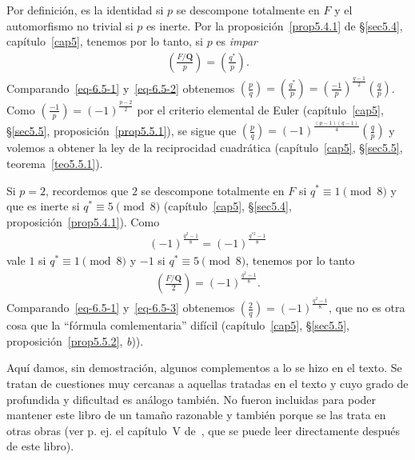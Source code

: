 \documentclass[10pt,oneside,bibtotoc,smallheadings,leqno,a5paper,DIV=12]{scrbook}
\newcommand{\QQ}{\mathbf{Q}}
\numberwithin{equation}{section}
\theoremstyle{defi}
\theoremstyle{enonce}
\theoremstyle{rem}
\numberwithin{theorem}{section}
\numberwithin{proposition}{section}
\numberwithin{definition}{section}
\numberwithin{lemma}{section}
\numberwithin{corollary}{section}
\numberwithin{example}{section}
\numberwithin{footnote}{section}%
\begin{document}
Por definici\'on, es la identidad si $p$ se descompone totalmente en $F$ y el automorfismo no trivial si $p$
es inerte. Por la proposici\'on~\ref{prop5.4.1} de \S\ref{sec5.4}, cap\'itulo~\ref{cap5}, tenemos por lo tanto, si $p$ es {\em impar}
\begin{gather}\label{eq-6.5-2}
\left(\frac{F/\QQ}{p}\right) = \left(\frac{q^{*}}{p}\right).
\end{gather}
Comparando~\eqref{eq-6.5-1} y~\eqref{eq-6.5-2} obtenemos $\left(\frac{p}{q}\right)=\left(\frac{q^{*}}{p}\right)
=\left(\frac{-1}{p}\right)^{\frac{q-1}{2}}\left(\frac{q}{p}\right)$. Como $\left(\frac{-1}{p}\right)=(-1)^{\frac{p-2}{2}}$
por el criterio elemental de Euler (cap\'itulo~\ref{cap5}, \S\ref{sec5.5}, proposici\'on~\ref{prop5.5.1}), se sigue que $\left(\frac{p}{q}\right)
=(-1)^{\frac{(p-1)(q-1)}{4}}\left(\frac{q}{p}\right)$ y volemos a obtener la ley de la reciprocidad cuadr\'atica
(cap\'itulo~\ref{cap5}, \S\ref{sec5.5}, teorema~\ref{teo5.5.1}).

Si $p=2$, recordemos que $2$ se descompone totalmente en $F$ si $q^{*}\equiv 1\pmod 8$ y que es inerte
si $q^{*}\equiv 5\pmod 8$ (cap\'itulo~\ref{cap5}, \S\ref{sec5.4}, proposici\'on~\ref{prop5.4.1}). Como
\begin{gather*}
(-1)^{\frac{q^{2}-1}{8}}=(-1)^{\frac{q^{*2}-1}{8}}
\end{gather*}
vale $1$ si $q^{*}\equiv 1\pmod 8$ y $-1$ si $q^{*}\equiv 5\pmod 8$, tenemos por lo tanto
\begin{gather}\label{eq-6.5-3}
\left(\frac{F/\QQ}{2}\right)=(-1)^{\frac{q^{2}-1}{8}}.
\end{gather}
Comparando~\eqref{eq-6.5-1} y~\eqref{eq-6.5-3} obtenemos $\left(\frac{2}{q}\right) = (-1)^{\frac{q^{2}-1}{8}}$,
que no es otra cosa que la ``f\'ormula comlementaria'' dif\'icil (cap\'itulo~\ref{cap5}, \S\ref{sec5.5},
proposici\'on~\ref{prop5.5.2}, {\itshape b})).


\setcounter{equation}{0}

Aqu\'i damos, sin demostraci\'on, algunos complementos a lo se hizo en el texto. Se tratan de cuestiones
muy cercanas a aquellas tratadas en el texto y cuyo grado de profundida y dificultad es an\'alogo tambi\'en.
No fueron incluidas para poder mantener este libro de un tama\~no razonable y tambi\'en porque se las trata
en otras obras (ver p. ej. el cap\'itulo~V de~\cite{ZariskiSamuel}, que se puede leer directamente despu\'es de este
libro).
\end{document}
